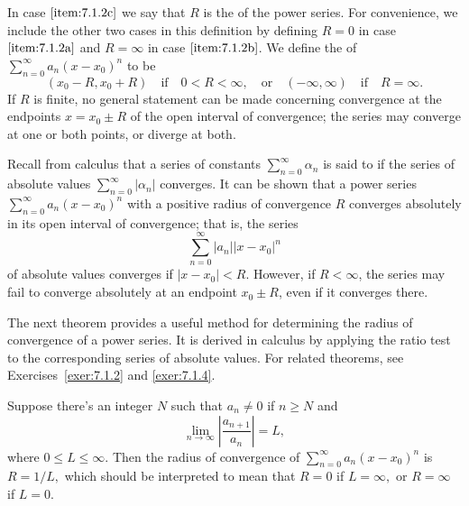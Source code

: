 \documentclass{ximera}
\begin{document}
In case $\ref{item:7.1.2c}$ we say that $R$ is the  of
the power series. For convenience, we include the other two cases
in this definition by defining $R=0$ in case $\ref{item:7.1.2a}$ and $R=\infty$ in
case $\ref{item:7.1.2b}$. We define the  of
$\sum_{n=0}^\infty a_n(x-x_0)^n$ to be
$$
 (x_0-R,x_0+R)\quad\mbox{if}\quad  0<R<\infty,\quad \mbox{or}\quad(-\infty,\infty) \quad\mbox{if}\quad R=\infty.
$$
If $R$ is finite, no general statement
can be made concerning convergence at the endpoints $x=x_0\pm R$ of
the open interval of convergence;   the series may converge at one or
both points, or diverge at both.


Recall from calculus that a series of constants
$\sum_{n=0}^\infty\alpha_n$ is said to  if
the series of absolute values $\sum_{n=0}^\infty|\alpha_n|$ converges.
It can be shown that a power series $\sum_{n=0}^\infty a_n(x-x_0)^n$
with a positive radius of convergence $R$ converges absolutely in its
open interval of convergence; that is, the series
$$
\sum_{n=0}^\infty |a_n||x-x_0|^n
$$
of absolute values  converges if $|x-x_0|<R$. However, if $R<\infty$,
the series may fail to converge absolutely at an endpoint $x_0\pm R$,
even if it converges there.

The next theorem provides a useful method for determining the
radius of convergence of a power series. It is derived in calculus by applying the ratio test to the corresponding series of absolute values.  For related theorems, see Exercises~\ref{exer:7.1.2} and \ref{exer:7.1.4}.

\begin{theorem}\label{thmtype:7.1.3}
Suppose there's an integer $N$ such that $a_n\ne0$ if
$n\geq N$ and
$$
\lim_{n\rightarrow\infty}\left|\frac{a_{n+1}}{a_n}\right|=L,
$$
where $0\leq L\leq \infty.$ Then the radius of convergence of
$\sum_{n=0}^\infty a_n(x-x_0)^n$ is $R=1/L,$ which should be interpreted
to mean that $R=0$ if $L=\infty,$ or $R=\infty$ if $L=0$.
\end{theorem}
\end{document}
